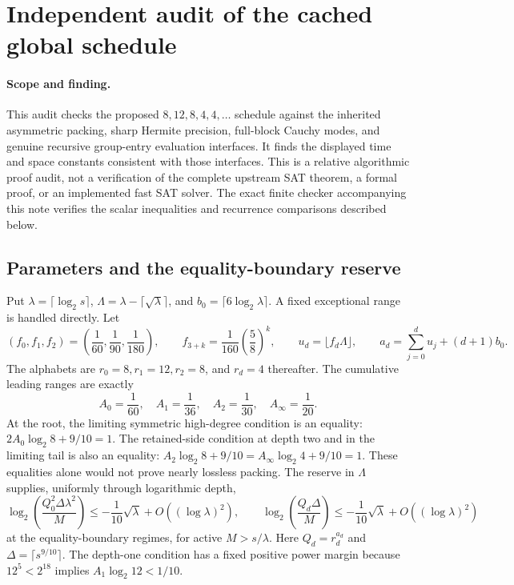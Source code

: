 \section{Independent audit of the cached global schedule}

\paragraph{Scope and finding.}
This audit checks the proposed $8,12,8,4,4,\ldots$ schedule against the
inherited asymmetric packing, sharp Hermite precision, full-block Cauchy
modes, and genuine recursive group-entry evaluation interfaces. It finds
the displayed time and space constants consistent with those interfaces.
This is a relative algorithmic proof audit, not a verification of the
complete upstream SAT theorem, a formal proof, or an implemented fast SAT
solver. The exact finite checker accompanying this note verifies the scalar
inequalities and recurrence comparisons described below.

\subsection{Parameters and the equality-boundary reserve}

Put $\lambda=\lceil\log_2s\rceil$,
$\Lambda=\lambda-\lceil\sqrt\lambda\rceil$, and
$b_0=\lceil6\log_2\lambda\rceil$. A fixed exceptional range is handled
directly. Let
\[
 (f_0,f_1,f_2)=\left(\frac1{60},\frac1{90},\frac1{180}\right),
 \qquad f_{3+k}=\frac1{160}\left(\frac58\right)^k,
 \qquad u_d=\lfloor f_d\Lambda\rfloor,
 \qquad a_d=\sum_{j=0}^d u_j+(d+1)b_0.
\]
The alphabets are $r_0=8,r_1=12,r_2=8$, and $r_d=4$ thereafter.
The cumulative leading ranges are exactly
\[
 A_0=\frac1{60},\quad A_1=\frac1{36},\quad
 A_2=\frac1{30},\quad A_\infty=\frac1{20}.
\]
At the root, the limiting symmetric high-degree condition is an equality:
$2A_0\log_2 8+9/10=1$. The retained-side condition at depth two and in
the limiting tail is also an equality:
$A_2\log_2 8+9/10=A_\infty\log_2 4+9/10=1$.
These equalities alone would not prove nearly lossless packing.
The reserve in $\Lambda$ supplies, uniformly through logarithmic depth,
\[
 \log_2\left(\frac{Q_0^2\Delta\lambda^2}{M}\right)
 \le-\frac1{10}\sqrt\lambda+O((\log\lambda)^2),
 \qquad
 \log_2\left(\frac{Q_d\Delta}{M}\right)
 \le-\frac1{10}\sqrt\lambda+O((\log\lambda)^2)
\]
at the equality-boundary regimes, for active $M>s/\lambda$.
Here $Q_d=r_d^{a_d}$ and $\Delta=\lceil s^{9/10}\rceil$.
The depth-one condition has a fixed positive power margin because
$12^5<2^{18}$ implies $A_1\log_2 12<1/10$.

